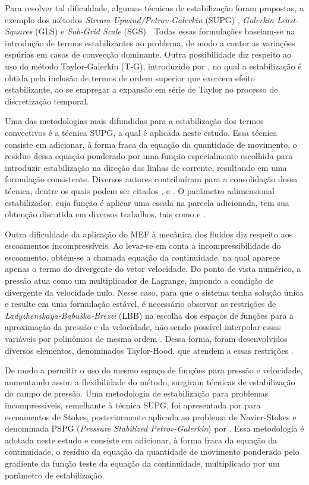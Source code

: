 Para resolver tal dificuldade, algumas técnicas de estabilização foram propostas, a exemplo dos métodos \textit{Stream-Upwind/Petrov-Galerkin} (SUPG) \cite{BrooksH:1982}, \textit{Galerkin Least-Squares} (GLS) \cite{HughesFH:1989} e \textit{Sub-Grid Scale} (SGS) \cite{Hughes:1995}. Todas essas formulações baseiam-se na introdução de termos estabilizantes ao problema, de modo a conter as variações espúrias em casos de convecção dominante. Outra possibilidade diz respeito ao uso do método Taylor-Galerkin (T-G), introduzido por , no qual a estabilização é obtida pela inclusão de termos de ordem superior que exercem efeito estabilizante, ao se empregar a expansão em série de Taylor no processo de discretização temporal.

Uma das metodologias mais difundidas para a estabilização dos termos convectivos é a técnica SUPG, a qual é aplicada neste estudo. Essa técnica consiste em adicionar, à forma fraca da equação da quantidade de movimento, o resíduo dessa equação ponderado por uma função especialmente escolhida para introduzir estabilização na direção das linhas de corrente, resultando em uma formulação consistente. Diversos autores contribuíram para a consolidação dessa técnica, dentre os quais podem ser citados ,  e . O parâmetro adimensional estabilizador, cuja função é aplicar uma escala na parcela adicionada, tem sua obtenção discutida em diversos trabalhos, tais como  e .

Outra dificuldade da aplicação do MEF à mecânica dos fluidos diz respeito aos escoamentos incompressíveis. Ao levar-se em conta a incompressibilidade do escoamento, obtém-se a chamada equação da continuidade, na qual aparece apenas o termo do divergente do vetor velocidade. Do ponto de vista numérico, a pressão atua como um multiplicador de Lagrange, impondo a condição de divergente da velocidade nulo. Nesse caso, para que o sistema tenha solução única e resulte em uma formulação estável, é necessário observar as restrições de \textit{Ladyzhenskaya-Babuška-Brezzi} (LBB) na escolha dos espaços de funções para a aproximação da pressão e da velocidade, não sendo possível interpolar essas variáveis por polinômios de mesma ordem \cite{BrezziF:1991,StrangF:2008,ZienkiewiczTN:2005b}. Dessa forma, foram desenvolvidos diversos elementos, denominados Taylor-Hood, que atendem a essas restrições \cite{DoneaH:2003}.

De modo a permitir o uso do mesmo espaço de funções para pressão e velocidade, aumentando assim a flexibilidade do método, surgiram técnicas de estabilização do campo de pressão. Uma metodologia de estabilização para problemas incompressíveis, semelhante à técnica SUPG, foi apresentada por  para escoamentos de Stokes, posteriormente aplicada ao problema de Navier-Stokes e denominada PSPG (\textit{Pressure Stabilized Petrov-Galerkin}) por . Essa metodologia é adotada neste estudo e consiste em adicionar, à forma fraca da equação da continuidade, o resíduo da equação da quantidade de movimento ponderado pelo gradiente da função teste da equação da continuidade, multiplicado por um parâmetro de estabilização.

